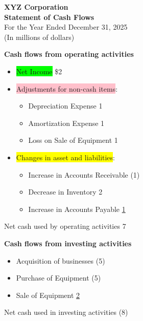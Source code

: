 \begin{tcolorbox}[colframe=black,colback=white,title=Example Statement of Cash Flow]
    \begin{center}
        \textbf{XYZ Corporation}\\
        \textbf{Statement of Cash Flows}\\
        For the Year Ended December 31, 2025\\
        (In millions of dollars)
    \end{center}

    \textbf{Cash flows from operating activities}
    \begin{itemize}[label={}, leftmargin=*]
        \item \colorbox{lime}{Net Income} \hfill \$2
        \item \colorbox{pink}{Adjustments for non-cash items}:
              \begin{itemize}[label={}, leftmargin=*]
                  \item Depreciation Expense \hfill 1
                  \item Amortization Expense \hfill 1
                  \item Loss on Sale of Equipment \hfill 1
              \end{itemize}
        \item \colorbox{yellow}{Changes in asset and liabilities}:
              \begin{itemize}[label={}, leftmargin=*]
                  \item Increase in Accounts Receivable \hfill (1)
                  \item Decrease in Inventory \hfill 2
                  \item Increase in Accounts Payable \hfill \underline{1}
              \end{itemize}
    \end{itemize}
    Net cash used by operating activities \hfill 7

    \textbf{Cash flows from investing activities}
    \begin{itemize}[label={}, leftmargin=*]
        \item Acquisition of businesses \hfill (5)
        \item Purchase of Equipment \hfill (5)
        \item Sale of Equipment \hfill \underline{2}
    \end{itemize}
    Net cash used in investing activities \hfill (8)


\end{tcolorbox}
